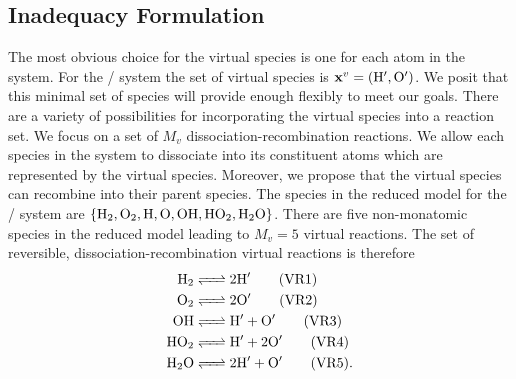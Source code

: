 \documentclass[fontsize=12pt, %
               paper=a4, %
               hyperref]{report}
\begin{document}
  \subsection{Inadequacy Formulation}
  The most obvious choice for 
  the virtual species is one for each atom in the system.  For the 
  / system the set of virtual species is 
  $\xv = \left(\ce{H}^{\prime}, \ce{O}^{\prime}\right)$.  We posit that 
  this minimal set of species will provide enough flexibly to meet 
  our goals.  There are a variety of possibilities for incorporating 
  the virtual species into a reaction set.  We focus on a set of 
  $M_{v}$ dissociation-recombination reactions.  We allow each species in 
  the system to dissociate into its constituent atoms which are represented 
  by the virtual species.  Moreover, we propose that the virtual species 
  can recombine into their parent species.  The species in the reduced model 
  for the / system are 
  $\left\{\ce{H2}, \ce{O2}, \ce{H}, \ce{O}, \ce{OH}, \ce{HO2}, \ce{H2O}\right\}$. 
  There are five non-monatomic species in the reduced model leading to 
  $M_{v}=5$ virtual reactions.  The set of reversible, dissociation-recombination 
  virtual reactions is therefore
  \begin{align}
    \ce{H2}  &\ce{<=>} 2\Hp \tag{VR1} \label{eq:VR1} \\
    \ce{O2}  &\ce{<=>} 2\Op \tag{VR2} \label{eq:VR2} \\
    \ce{OH}  &\ce{<=>} \Hp + \Op \tag{VR3} \label{eq:VR3} \\
    \ce{HO2} &\ce{<=>} \Hp + 2\Op \tag{VR4} \label{eq:VR4} \\
    \ce{H2O} &\ce{<=>} 2\Hp + \Op \tag{VR5} \label{eq:VR5}.
  \end{align}
  
\end{document}
